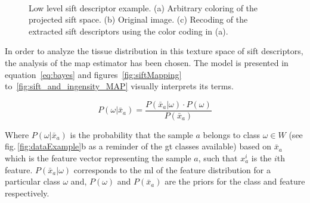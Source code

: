 \documentclass[a4paper, 10pt, conference]{llncs}      %
\begin{document}
\begin{figure}[Htbp]
\centering
{}~
\,
\caption{Low level \ac{sift} descriptor example. (a) Arbitrary coloring of the projected \acs{sift} space. (b) Original image. (c) Recoding of the extracted \ac{sift} descriptors using the color coding in (a). }
\label{fig:siftImg}
\end{figure}

In order to analyze the tissue distribution in this texture space of \ac{sift} descriptors, the analysis of the \ac{map} estimator has been chosen. The model is presented in equation~\ref{eq:bayes} and figures~\ref{fig:siftMapping} to~\ref{fig:sift_and_ingensity_MAP} visually interprets its terms.

\begin{equation}
P(\omega|\bar{x}_a) = \frac{P(\bar{x}_a|\omega)\cdot P(\omega)}{P(\bar{x}_a)}
\label{eq:bayes}
\end{equation}

Where $P(\omega|\bar{x}_a)$ is the probability that the sample $a$ belongs to class $\omega \in W$ (see fig.\,\ref{fig:dataExample}b as a reminder of the \ac{gt} classes available) based on $\bar{x}_a$ which is the feature vector representing the sample $a$, such that $x_a^i$ is the $i$th feature. $P(\bar{x}_a|\omega)$ corresponds to the \ac{ml} of the feature distribution for a particular class $\omega$ and, $P(\omega)$ and $P(\bar{x}_a)$ are the priors for the class and feature respectively.
\end{document}
